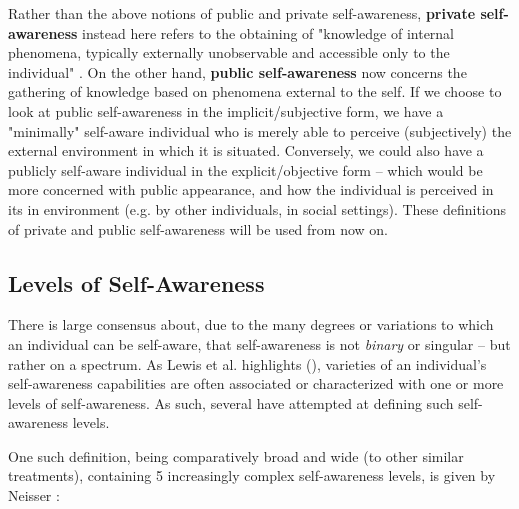 \documentclass{article}
\begin{document}
Rather than the above notions of public and private self-awareness, \textbf{private self-awareness} instead here refers to the obtaining of "knowledge of internal phenomena, typically externally unobservable and accessible only to the individual" \cite{sacs16_ch2}. On the other hand, \textbf{public self-awareness} now concerns the gathering of knowledge based on phenomena external to the self. If we choose to look at public self-awareness in the implicit/subjective form, we have a "minimally" self-aware individual who is merely able to perceive (subjectively) the external environment in which it is situated. Conversely, we could also have a publicly self-aware individual in the explicit/objective form -- which would be more concerned with public appearance, and how the individual is perceived in its in environment (e.g. by other individuals, in social settings). These definitions of private and public self-awareness will be used from now on.

\subsection{Levels of Self-Awareness}

There is large consensus about, due to the many degrees or variations to which an individual can be self-aware, that self-awareness is not \textit{binary} or singular -- but rather on a spectrum. As Lewis et al. highlights (\cite{sacs16_ch2, sacs17_ch3}), varieties of an individual's self-awareness capabilities are often associated or characterized with one or more levels of self-awareness. As such, several have attempted at defining such self-awareness levels.

One such definition, being comparatively broad and wide (to other similar treatments), containing 5 increasingly complex self-awareness levels, is given by Neisser \cite{neisser284}:
\end{document}
